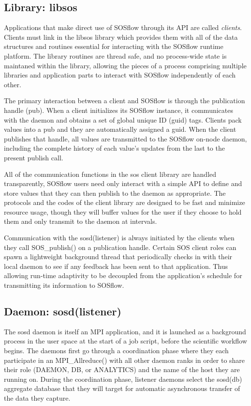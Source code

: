 \subsection{Library: libsos} %
%
Applications that make direct use of SOSflow through its API are called
\textit{clients}.
%
Clients must link in the libsos library which provides them with all of
the data structures and routines essential for interacting with
the SOSflow runtime platform.
%
The library routines are thread safe, and no process-wide state is
maintaned within the library, allowing the pieces of a process
comprising multiple libraries and application parts to interact with
SOSflow independently of each other.
%
\par
The primary interaction between a client and SOSflow is through the
publication handle (pub).
%
When a client initializes its SOSflow instance, it communicates with the
daemon and obtains a set of global unique ID (guid) tags.
%
Clients pack values into a pub and they are automatically assigned a guid.
%
When the client publishes that handle, all values are transmitted to
the SOSflow on-node daemon, including the complete history of each
value's updates from the last to the present publish call.
%
\par
%
All of the communication functions in the sos client library are
handled transparently, SOSflow users need only interact with a simple API
to define and store values that they can then publish to the daemon
as appropriate.
%
The protocols and the codes of the client library are designed to be
fast and minimize resource usage, though they will buffer values for
the user if they choose to hold them and only transmit to the daemon
at intervals.
%
\par
%
Communication with the sosd(listener) is always initiated by the
clients when they call SOS_publish() on a publication handle.
%
Certain SOS client roles can spawn a lightweight background thread that
periodically checks in with their local daemon to see if any feedback
has been sent to that application. 
%
Thus allowing run-time adaptivity to
be decoupled from the application's schedule for transmitting its
information to SOSflow.


\subsection{Daemon: sosd(listener)} %
The sosd daemon is itself an MPI application, and it is launched as a
background process in the user space at the start of a job script, before
the scientific workflow begins.
%
The daemons first go through a coordination phase where they each
participate in an MPI\_Allreduce() with all other daemon ranks in
order to share their role (DAEMON, DB, or ANALYTICS) and the name of
the host they are running on.
%
During the coordination phase, listener daemons select the sosd(db)
aggregate database that they will target for automatic asynchronous
transfer of the data they capture.

